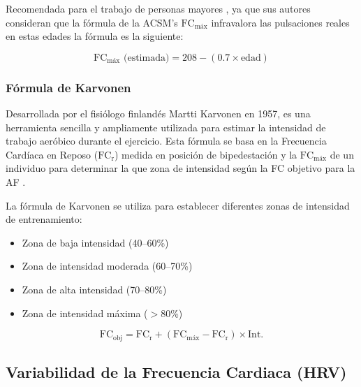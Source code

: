 Recomendada para el trabajo de personas mayores \citep{Tanaka2001AgePredicted}, ya que sus autores consideran que la fórmula de la ACSM's $\text{FC}_{\text{máx}}$ infravalora las pulsaciones reales en estas edades la fórmula es la siguiente:

\begin{equation}
\text{FC}_{\text{máx}} \text{ (estimada)} = 208 - (0.7 \times \text{edad})
\label{eq:tanaka}
\end{equation}

\subsubsection{Fórmula de Karvonen}
\label{subsubsec:formula_karvonen}

Desarrollada por el fisiólogo finlandés Martti Karvonen en 1957, es una herramienta sencilla y ampliamente utilizada para estimar la intensidad de trabajo aeróbico durante el ejercicio. Esta fórmula se basa en la Frecuencia Cardíaca en Reposo ($\text{FC}_{\text{r}}$) medida en posición de bipedestación y la $\text{FC}_{\text{máx}}$ de un individuo para determinar la que zona de intensidad según la FC objetivo para la AF \citep{Abellan2014Prescripcion}.

La fórmula de Karvonen se utiliza para establecer diferentes zonas de intensidad de entrenamiento:

\begin{itemize}
    \item Zona de baja intensidad (40--60\%)
    \item Zona de intensidad moderada (60--70\%)
    \item Zona de alta intensidad (70--80\%)
    \item Zona de intensidad máxima ($>$80\%)
\end{itemize}

\begin{equation}
\text{FC}_{\text{obj}} = \text{FC}_{\text{r}} + (\text{FC}_{\text{máx}} - \text{FC}_{\text{r}}) \times \text{Int.}
\label{eq:karvonen}
\end{equation}

\subsection{Variabilidad de la Frecuencia Cardiaca (HRV)}
\label{subsec:hrv}


